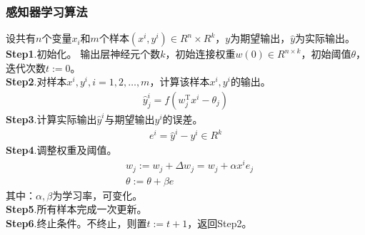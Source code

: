             \subsubsection{感知器学习算法}
                \par
                设共有$n$个变量$x_i$和$m$个样本$(x^i,y^i)\in R^n\times R^k$，$y$为期望输出，$\hat{y}$为实际输出。\\
                \textbf{Step1}.初始化。
                输出层神经元个数$k$，初始连接权重$w(0)\in R^{n\times k}$，初始阈值$\theta$，迭代次数$t:=0$。\\
                \textbf{Step2}.对样本$x^i,y^i,i = 1,2,\dots,m$，计算该样本$x^i,y^i$的输出。
                \begin{align*}
                \hat{y}_j^i = f(w_j^\mathrm{T}x^i - \theta_j)
                \end{align*}
                \textbf{Step3}.计算实际输出$\hat{y}^i$与期望输出$y^i$的误差。
                \begin{align*}
                e^i = \hat{y}^i - y^i \in R^k
                \end{align*}
                \textbf{Step4}.调整权重及阈值。
                \begin{align*}
                & w_j:=w_j + \Delta w_j = w_j + \alpha x^i e_j \\
                & \theta:=\theta + \beta e
                \end{align*}
                其中：$\alpha,\beta$为学习率，可变化。\\
                \textbf{Step5}.所有样本完成一次更新。\\
                \textbf{Step6}.终止条件。不终止，则置$t:=t+1$，返回Step2。\\
